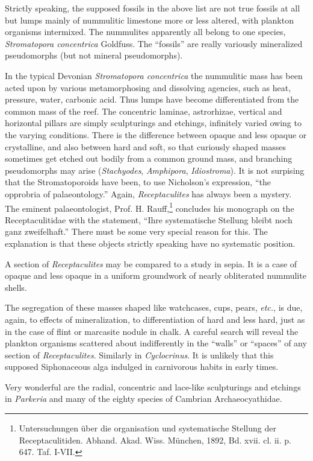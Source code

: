 \documentclass[a4paper, 12pt, oneside]{article}
\begin{document}
Strictly speaking, the supposed fossils in the above list are not true fossils at all but lumps mainly of nummulitic limestone more or less altered, with plankton organisms intermixed. The nummulites apparently all belong to one species, \emph{Stromatopora concentrica} Goldfuss. The ``fossils'' are really variously mineralized pseudomorphs (but not mineral pseudomorphs).

In the typical Devonian \emph{Stromatopora concentrica} the nummulitic mass has been acted upon by various metamorphosing and dissolving agencies, such as heat, pressure, water, carbonic acid. Thus lumps have become differentiated from the common mass of the reef. The concentric laminae, astrorhizae, vertical and horizontal pillars are simply sculpturings and etchings, infinitely varied owing to the varying conditions. There is the difference between opaque and less opaque or crystalline, and also between hard and soft, so that curiously shaped masses sometimes get etched out bodily from a common ground mass, and branching pseudomorphs may arise (\emph{Stachyodes}, \emph{Amphipora}, \emph{Idiostroma}). It is not surpising that the Stromatoporoids have been, to use Nicholson's expression, ``the opprobria of palaeontology.'' Again, \emph{Receptaculites} has always been a mystery. The eminent palaeontologist, Prof. H. Rauff,\footnote{Untersuchungen über die organisation und systematische Stellung der Receptaculitiden. Abhand. Akad. Wiss. München, 1892, Bd. xvii. cl. ii. p. 647. Taf. I-VII.} concludes his monograph on the Receptaculitidae with the statement, ``Ihre systematische Stellung bleibt noch ganz zweifelhaft.'' There must be some very special reason for this. The explanation is that these objects strictly speaking have no systematic position.

A section of \emph{Receptaculites} may be compared to a study in sepia. It is a case of opaque and less opaque in a uniform groundwork of nearly obliterated nummulite shells.

The segregation of these masses shaped like watchcases, cups, pears, \emph{etc.}, is due, again, to effects of mineralization, to differentiation of hard and less hard, just as in the case of flint or marcasite nodule in chalk. A careful search will reveal the plankton organisms scattered about indifferently in the ``walls'' or ``spaces'' of any section of \emph{Receptaculites}. Similarly in \emph{Cyclocrinus}. It is unlikely that this supposed Siphonaceous alga indulged in carnivorous habits in early times.

Very wonderful are the radial, concentric and lace-like sculpturings and etchings in \emph{Parkeria} and many of the eighty species of Cambrian Archaeocyathidae.
\end{document}
